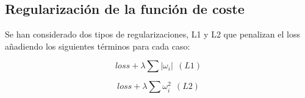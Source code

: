 









\subsection{Regularización de la función de coste}
Se han considerado dos tipos de regularizaciones, L1 y L2 que penalizan el loss añadiendo
los siguientes términos para cada caso:

\begin{equation}
    loss + \lambda \sum |\omega_i| ~~(L1)
\end{equation}

\begin{equation}
    loss + \lambda \sum \omega^2_i ~~(L2)
\end{equation}

